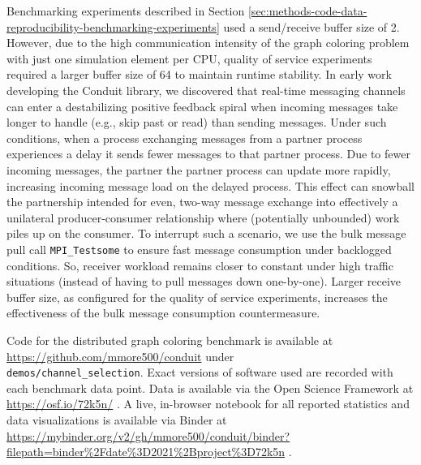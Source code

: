 Benchmarking experiments described in Section \ref{sec:methods-code-data-reproducibility-benchmarking-experiments} used a send/receive buffer size of 2.
However, due to the high communication intensity of the graph coloring problem with just one simulation element per CPU, quality of service experiments required a larger buffer size of 64 to maintain runtime stability.
In early work developing the Conduit library, we discovered that real-time messaging channels can enter a destabilizing positive feedback spiral when incoming messages take longer to handle (e.g., skip past or read) than sending messages.
Under such conditions, when a process exchanging messages from a partner process experiences a delay it sends fewer messages to that partner process.
Due to fewer incoming messages, the partner the partner process can update more rapidly, increasing incoming message load on the delayed process.
This effect can snowball the partnership intended for even, two-way message exchange into effectively a unilateral producer-consumer relationship where (potentially unbounded) work piles up on the consumer.
To interrupt such a scenario, we use the bulk message pull call \verb|MPI_Testsome| to ensure fast message consumption under backlogged conditions.
So, receiver workload remains closer to constant under high traffic situations (instead of having to pull messages down one-by-one).
Larger receive buffer size, as configured for the quality of service experiments, increases the effectiveness of the bulk message consumption countermeasure.

Code for the distributed graph coloring benchmark is available at \url{https://github.com/mmore500/conduit} under \\ \texttt{demos/channel\_selection}.
Exact versions of software used are recorded with each benchmark data point.
Data is available via the Open Science Framework at \url{https://osf.io/72k5n/} \citep{foster2017open}.
A live, in-browser notebook for all reported statistics and data visualizations is available via Binder at \url{https://mybinder.org/v2/gh/mmore500/conduit/binder?filepath=binder%2Fdate%3D2021%2Bproject%3D72k5n} \citep{jupyter2018binder}.
